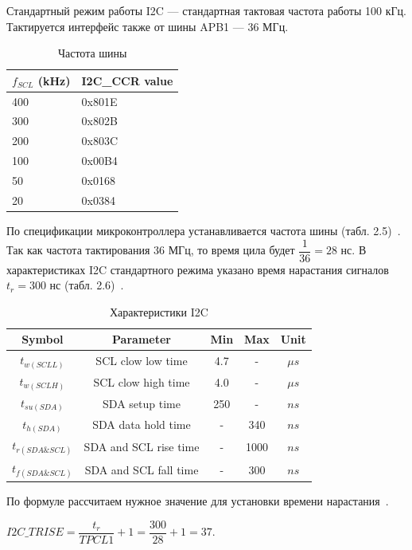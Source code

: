 	Стандартный режим работы I2C --- стандартная тактовая частота работы 100 кГц. Тактируется интерфейс также от шины APB1 --- 36 МГц. 
\begin{table}[H]
\caption{Частота шины}
\begin{tabular}{|p{4 cm}|p{4 cm}|}
\hline
$f_{SCL}$ (kHz)  & I2C\_CCR value \\ \hline
400 & 0x801E \\ \hline
300 & 0x802B \\ \hline
200 & 0x803C \\ \hline
100 & 0x00B4 \\ \hline
50  & 0x0168 \\ \hline
20  & 0x0384 \\ \hline
\end{tabular}
\end{table}
	По спецификации микроконтроллера устанавливается частота шины (табл. 2.5)~\cite{f103}. Так как частота тактирования 36 МГц, то время цила будет $\dfrac{1}{36}=28$ нс. В характеристиках I2C стандартного режима указано время нарастания сигналов $t_{r}=300$ нс (табл. 2.6)~\cite{f103}.
	
	\begin{table}[H]
\caption{Характеристики I2C}
\begin{tabular}{|c|c|c|c|c|}
\hline 
Symbol & Parameter & Min & Max & Unit \\ 
\hline 
$ t_{w(SCLL)} $ & SCL clow low time & 4.7 & - & $\mu s $ \\ 
\hline 
$ t_{w(SCLH)} $ & SCL clow high time & 4.0 & - & $\mu s$ \\ 
\hline 
$ t_{su(SDA)} $ & SDA setup time & 250 & - & $ns$ \\ 
\hline 
$ t_{h(SDA)} $ & SDA data hold time & - & 340 & $ns$ \\ 
\hline 
$ t_{r(SDA\&SCL)} $  & SDA and SCL rise time & - & 1000 & $ns$ \\ 
\hline 
$ t_{f(SDA\&SCL)} $ & SDA and SCL fall time & - & 300 & $ns$ \\ 
\hline 
\end{tabular}
\end{table}
	
	По формуле рассчитаем нужное значение для установки времени нарастания~\cite{czssd1306}.
	\begin{center}
	$I2C\_TRISE=\dfrac{t_{r}}{TPCL1}+1=\dfrac{300}{28}+1=37$.
	\end{center}

